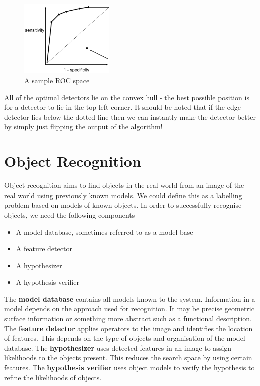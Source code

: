\documentclass{article}
\begin{document}
	\begin{figure}
		\centering
		\includegraphics[width=0.4\textwidth]{roc_analysis}
		\caption{A sample ROC space}
		\label{fig:roc_analysis}
	\end{figure}
	
	All of the optimal detectors lie on the convex hull - the best possible position is for a detector to lie in the top left corner. It should be noted that if the edge detector lies below the dotted line then we can instantly make the detector better by simply just flipping the output of the algorithm!
		
	\section{Object Recognition}
	Object recognition aims to find objects in the real world from an image of the real world using previously known models. We could define this as a labelling problem based on models of known objects. In order to successfully recognise objects, we need the following components
	\begin{itemize}
		\item A model database, sometimes referred to as a model base
		\item A feature detector
		\item A hypothesizer
		\item A hypothesis verifier
	\end{itemize}

	The \textbf{model database} contains all models known to the system. Information in a model depends on the approach used for recognition. It may be precise geometric surface information or something more abstract such as a functional description. The \textbf{feature detector} applies operators to the image and identifies the location of features. This depends on the type of objects and organisation of the model database. The \textbf{hypothesizer} uses detected features in an image to assign likelihoods to the objects present. This reduces the search space by using certain features. The \textbf{hypothesis verifier} uses object models to verify the hypothesis to refine the likelihoods of objects.
	
\end{document}
